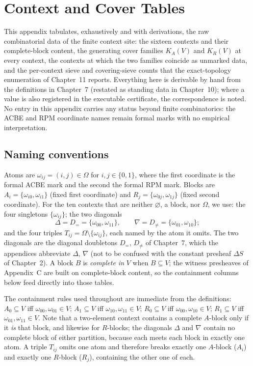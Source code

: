\chapter{Context and Cover Tables}
\label{appA:chapter}

This appendix tabulates, exhaustively and with derivations, the raw
combinatorial data of the finite context site: the sixteen contexts and
their complete-block content, the generating cover families $K_A(V)$ and
$K_R(V)$ at every context, the contexts at which the two families coincide
as unmarked data, and the per-context sieve and covering-sieve counts that
the exact-topology enumeration of Chapter~11 reports. Everything here is
derivable by hand from the definitions in Chapter~7 (restated as standing
data in Chapter~10); where a value is also
registered in the executable certificate, the correspondence is noted. No
entry in this appendix carries any status beyond finite combinatorics: the
ACBE and RPM coordinate names remain formal marks with no empirical
interpretation.

\section{Naming conventions}
\label{appA:sec:naming}

\begin{notation}
\label{appA:not:names}
Atoms are $\omega_{ij} = (i, j) \in \Omega$ for $i, j \in \{0, 1\}$, where
the first coordinate is the formal ACBE mark and the second the formal RPM
mark. Blocks are $A_i = \{\omega_{i0}, \omega_{i1}\}$ (fixed first
coordinate) and $R_j = \{\omega_{0j}, \omega_{1j}\}$ (fixed second
coordinate). For the ten contexts that are neither $\varnothing$, a block,
nor $\Omega$, we use: the four singletons $\{\omega_{ij}\}$; the two
diagonals
\[
\Delta = D_{=} = \{\omega_{00}, \omega_{11}\}, \qquad
\nabla = D_{\neq} = \{\omega_{01}, \omega_{10}\};
\]
and the four triples $T_{ij} = \Omega \setminus \{\omega_{ij}\}$, each
named by the atom it omits. The two diagonals are the diagonal
doubletons $D_{=}$, $D_{\neq}$ of Chapter~7, which the appendices abbreviate
$\Delta$, $\nabla$ (not to be confused with the constant presheaf
$\Delta S$ of Chapter~2). A block $B$ is \emph{complete in} $V$ when
$B \subseteq V$; the witness presheaves of Appendix~C are built on
complete-block content, so the containment columns below feed directly into
those tables.
\end{notation}

The containment rules used throughout are immediate from the definitions:
$A_0 \subseteq V$ iff $\omega_{00}, \omega_{01} \in V$;
$A_1 \subseteq V$ iff $\omega_{10}, \omega_{11} \in V$;
$R_0 \subseteq V$ iff $\omega_{00}, \omega_{10} \in V$;
$R_1 \subseteq V$ iff $\omega_{01}, \omega_{11} \in V$. Note that a
two-element context contains a complete $A$-block only if it \emph{is} that
block, and likewise for $R$-blocks; the diagonals $\Delta$ and $\nabla$
contain no complete block of either partition, because each meets each
block in exactly one atom. A triple $T_{ij}$ omits one atom and therefore
breaks exactly one $A$-block ($A_i$) and exactly one $R$-block ($R_j$),
containing the other one of each.


